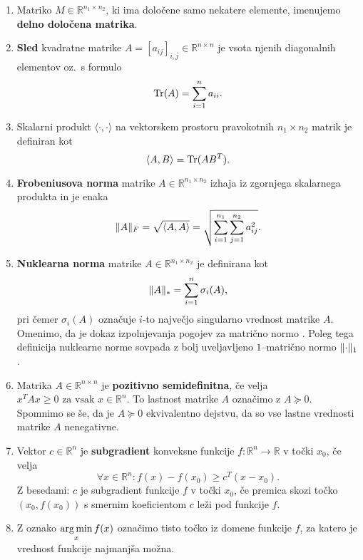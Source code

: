 \begin{enumerate}
  \item Matriko $M \in \mathbb{R}^{n_1 \times n_2}$, ki ima določene samo nekatere elemente, imenujemo \textbf{delno določena matrika}.
  \item \textbf{Sled} kvadratne  matrike $A=[a_{ij}]_{i,j}\in \mathbb R^{n\times n}$ je vsota njenih diagonalnih elementov
        oz.\ s formulo
        \[
          \operatorname{Tr}(A) = \sum_{i = 1}^{n} a_{ii}.
        \]
  \item Skalarni produkt
        $\langle\cdot,\cdot\rangle$ na vektorskem prostoru pravokotnih $n_1\times n_2$ matrik je definiran kot \[
          \langle A, B \rangle = \operatorname{Tr}(AB^T).
        \]
  \item \textbf{Frobeniusova norma} matrike $A \in \mathbb{R}^{n_1 \times n_2}$ izhaja iz zgornjega skalarnega produkta in je enaka \[
          \lVert A\rVert_F =
          \sqrt{\langle A, A \rangle}=
          \sqrt{\sum_{i = 1}^{n_1} \sum_{j = 1}^{n_2} a_{ij}^2}.
        \]
  \item \textbf{Nuklearna norma} matrike $A\in \mathbb R^{n_1\times n_2}$ je definirana kot \[
          \lVert A\rVert_* = \sum_{i = 1}^{n} \sigma_i(A),
        \] pri čemer $\sigma_i(A)$ označuje $i$-to največjo singularno vrednost matrike $A$.
        Omenimo, da je dokaz izpolnjevanja pogojev za matrično normo \cite[izrek 5.6.18]{matrixAnalysis}. Poleg tega definicija nuklearne norme sovpada z bolj uveljavljeno $1$--matrično normo $\lVert\cdot\rVert_1$.
  \item Matrika $A \in \mathbb{R}^{n \times n}$ je \textbf{pozitivno semidefinitna}, če velja $x^TAx \ge 0 \text{ za vsak } x \in \mathbb{R}^n$. To lastnost matrike $A$ označimo z $A \succeq 0$.
        Spomnimo se še, da je $A \succeq 0$ ekvivalentno dejstvu, da so vse  lastne vrednosti matrike $A$ nenegativne.
  \item Vektor $c\in \mathbb R^n$ je \textbf{subgradient} konveksne funkcije $f: \mathbb{R}^n \rightarrow \mathbb{R}$ v točki $x_0$, če velja
        \[
          \forall x\in\mathbb R^n: f(x) - f(x_0) \geq c^T(x - x_0).
        \]
        Z besedami: $c$ je subgradient funkcije $f$ v točki $x_0$, če premica skozi točko $(x_0,f(x_0))$ s smernim koeficientom $c$ leži pod  funkcije $f$.
  \item Z oznako
        $\displaystyle\operatorname*{arg\,min}_x f(x)$
        označimo tisto točko iz domene funkcije $f$, za katero je vrednost funkcije najmanjša možna.
\end{enumerate}






